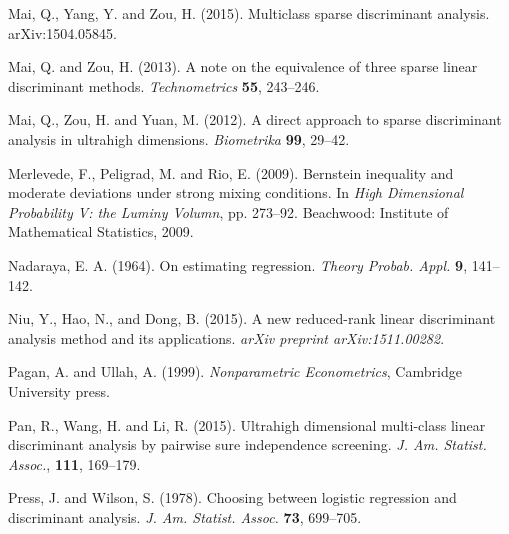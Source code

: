 \documentclass[11pt]{article}
\theoremstyle{definition}
\begin{document}
\begin{thebibliography}{}
 	{Mai, Q., Yang, Y.} and {Zou, H.} (2015).  Multiclass sparse discriminant analysis. {arXiv:1504.05845.}
 	
 	{Mai, Q.} and {Zou, H.} (2013). A note on the equivalence of three sparse linear discriminant methods. 
 	\textit{Technometrics} {\bf 55}, 243--246.
 	
 	{Mai, Q.}, {Zou, H.} and {Yuan, M.} (2012).
 	{A direct approach to sparse discriminant analysis in ultrahigh
 		dimensions.}
 	\textit{Biometrika} {\bf 99}, 29--42.
 	
 	
 	
 	
 	{Merlevede, F., Peligrad, M.} and {Rio, E.} (2009).
 	{Bernstein inequality and moderate deviations under strong mixing conditions.}
 	In  \textit{High Dimensional Probability V: the Luminy Volumn}, pp. 273--92. Beachwood: Institute of Mathematical Statistics, 2009.
 	
 	
 	
 	{Nadaraya, E. A. } (1964).
 	{On estimating regression.}
 	\textit{Theory Probab. Appl.} {\bf 9}, 141--142.
 	
 	
 	
 	Niu, Y., Hao, N., and Dong, B. (2015). A new reduced-rank linear discriminant analysis method and its applications. {\it arXiv preprint arXiv:1511.00282}.
 	
 	{Pagan, A.} and {Ullah, A.} (1999).
 	\textit{Nonparametric Econometrics}, Cambridge University press.
 	
 	{Pan, R., Wang, H.} and {Li, R.} (2015). Ultrahigh dimensional multi-class linear discriminant analysis by pairwise sure independence screening. \textit{J. Am. Statist. Assoc.}, {\bf 111}, 169--179.
 	
 	{Press, J.} and {Wilson, S.} (1978). Choosing between logistic regression and discriminant analysis. {\it J. Am. Statist. Assoc.} {\bf 73}, 699--705.
 	

\end{thebibliography}
\end{document}
